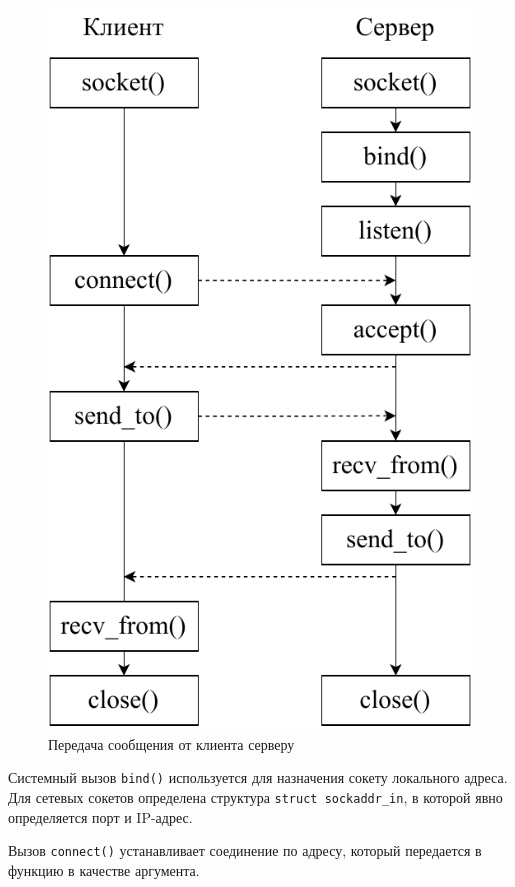 \begin{figure}[ht]
	\centering
	\includegraphics[scale=0.8]{img/tcp.pdf}
	\caption{Передача сообщения от клиента серверу}
	\label{tcp}
\end{figure}

Системный вызов \texttt{bind()} используется для назначения сокету локального адреса. Для сетевых сокетов определена структура \texttt{struct sockaddr\_in}, в которой явно определяется порт и IP-адрес.

Вызов \texttt{connect()} устанавливает соединение по адресу, который передается в функцию в качестве аргумента.

